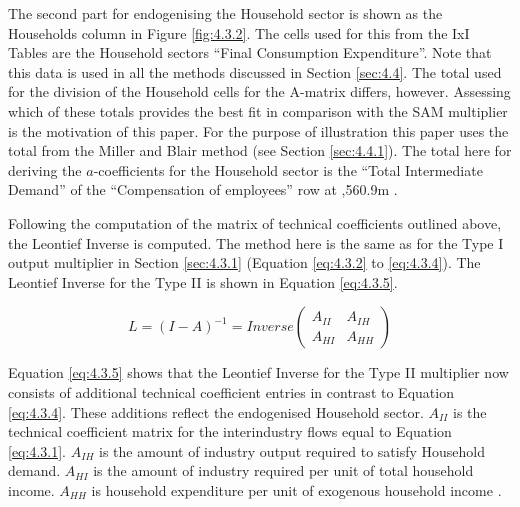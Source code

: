 \begin{doublespacing}
\bigskip

The second part for endogenising the Household sector is shown as the Households column in  Figure \ref{fig:4.3.2}. The cells used for this from the IxI Tables are the Household sectors ``Final Consumption Expenditure''. Note that this data is used in all the methods discussed in  Section \ref{sec:4.4}. The total used for the division of the Household cells for the A-matrix differs, however. Assessing which of these totals provides the best fit in comparison with the SAM multiplier is the motivation of this paper. For the purpose of illustration this paper uses the total from the Miller and Blair  method (see Section \ref{sec:4.4.1}). The total here for deriving the $a$-coefficients for the Household sector is the  ``Total Intermediate Demand'' of the ``Compensation of employees'' row at ,560.9m \cite{ScottishGovernment2013a}.

\bigskip

Following the computation of the matrix of technical coefficients outlined above, the Leontief Inverse is computed. The method here is the same as for the Type I output multiplier in Section \ref{sec:4.3.1} (Equation \ref{eq:4.3.2} to \ref{eq:4.3.4}). The Leontief Inverse for the Type II is shown in Equation \ref{eq:4.3.5}.

  \bigskip  \begin{singlespacing}  \begin{equation} \label{eq:4.3.5}
  L=(I-A)^{-1} = Inverse   \begin{pmatrix}
  A_{II} &  A_{IH} \\
  A_{HI}  & A_{HH}
  \end{pmatrix} 
  \end{equation}   \end{singlespacing}  \bigskip

Equation \ref{eq:4.3.5} shows that the Leontief Inverse for the Type II multiplier now consists of additional technical coefficient entries in contrast to Equation \ref{eq:4.3.4}. These additions reflect the endogenised Household sector. $A_{II}$ is the technical coefficient matrix for the interindustry flows equal to Equation \ref{eq:4.3.1}. $A_{IH}$ is the amount of industry output required to satisfy Household demand. $A_{HI}$ is the amount of industry required per unit of total household income. $A_{HH}$ is household expenditure per unit of exogenous household income \cite{ScottishGovernment2013a}.

\bigskip


\end{doublespacing}
